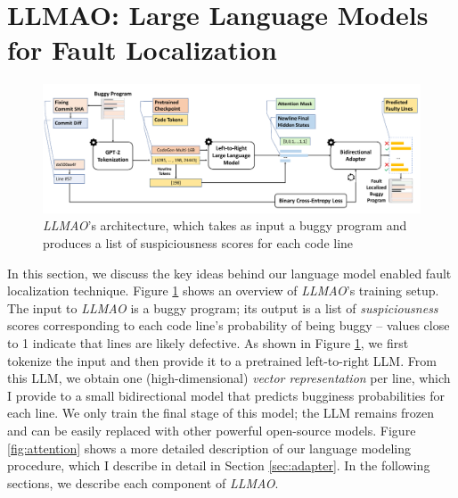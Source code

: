 \documentclass[12pt,openany,oneside,table]{cmuthesis}
\begin{document}
\section{LLMAO: Large Language Models for Fault Localization}
\label{sec:LLMAO}

\begin{figure}
\centering
\includegraphics[width=\textwidth]{figures/approach/overview.pdf}
\caption{\small \textit{LLMAO}’s architecture, which takes as input a buggy program and produces a list of suspiciousness scores for each code line}
\label{fig:overview-llmao}
\end{figure}

In this section, we discuss the key ideas behind our language model enabled fault localization technique.
Figure \ref{fig:overview-llmao} shows an overview of \textit{LLMAO}'s training setup. The input to \textit{LLMAO} is a buggy program; its output is a list of \emph{suspiciousness} scores corresponding to each code line's probability of being buggy -- values close to 1 indicate that lines are likely defective. As shown in Figure \ref{fig:overview-llmao}, we first tokenize the input and then provide it to a pretrained left-to-right LLM. From this LLM, we obtain one (high-dimensional) \emph{vector representation} per line, which I provide to a small bidirectional model that predicts bugginess probabilities for each line. We only train the final stage of this model; the LLM remains frozen and can be easily replaced with other powerful open-source models. Figure \ref{fig:attention} shows a more detailed description of our language modeling procedure, which I describe in detail in Section \ref{sec:adapter}.
In the following sections, we describe each component of \textit{LLMAO}.
    
\end{document}
